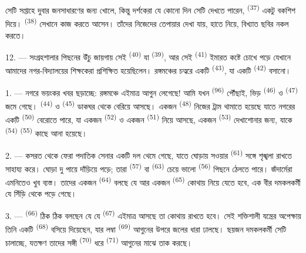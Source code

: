 সেটি সপ্তাহে দুবার জনসাধারণের জন্য খোলে, কিন্তু দর্শকেরা যে কোনো দিন সেটি
দেখতে পারেন,  \textsuperscript{(37)} একটু বকশিশ দিয়ে।
 \textsuperscript{(38)} সেখানে কাজ করতে আসেন। তাঁদের নিজেদের
তেপায়ার  দেখা যায়, হাতে  নিয়ে, বিখ্যাত ছবির
নকল করতে।

12. --- সংগ্রহশালার পিছনের উঁচু জায়গায় সেই 
\textsuperscript{(40)} যা  \textsuperscript{(39)}, আর সেই
 \textsuperscript{(41)} ইমারত কষ্টে চোখে
পড়ে যেখানে আমাদের নগর-বিদ্যালয়ের শিক্ষকেরা প্রশিক্ষিত হয়েছিলেন। রঙ্গমঞ্চের
চত্বরে একটি  \textsuperscript{(43)}, যা একটি  \textsuperscript{(42)} বসানো।

\VUsaut{5.0mm}
\VUsaut{3.0mm}

\VUsaut{3.4mm}

1. --- নগরে ভয়ংকর খবর ছড়াচ্ছে: রঙ্গমঞ্চে এইমাত্র আগুন লেগেছে! আমি যখন
 \textsuperscript{(96)} পৌঁছাই, ভিড় 
\textsuperscript{(46)} ও  \textsuperscript{(47)} জমে গেছে।
 \textsuperscript{(44)} ও 
\textsuperscript{(45)} ডাকঘর থেকে বেরিয়ে আসছে। একজন 
\textsuperscript{(48)} নিজের ট্রাম থামাতে হয়েছে যাতে নগরের একটি
 \textsuperscript{(50)} বেরোতে পারে, যা একজন
 \textsuperscript{(52)} ও একজন 
\textsuperscript{(51)} নিয়ে আসছে, একজন  \textsuperscript{(53)}
দেখাশোনার জন্য, যাকে  \textsuperscript{(54)}
 \textsuperscript{(55)} কাছে আনা হয়েছে।

2. --- কসরত থেকে ফেরা পদাতিক সেনার একটি দল থেমে গেছে, যাতে ঘোড়ায় সওয়ার
 \textsuperscript{(61)} সঙ্গে শৃঙ্খলা রাখতে সাহায্য করে।
 ঘোড়া দু পায়ে দাঁড়িয়ে পড়ে; তারা 
\textsuperscript{(57)} বা  \textsuperscript{(63)} চেয়ে ভালো
 \textsuperscript{(56)} পিছনে ঠেলতে পারে। জঁদার্মেরা এমনিতেও খুব
ব্যস্ত। তাদের একজন  \textsuperscript{(64)} বলছে যে আর
একজন  \textsuperscript{(65)} কোথায় নিয়ে যেতে হবে, এক বীর দমকলকর্মী
যে সিঁড়ি থেকে পড়ে গেছে।

3. ---  \textsuperscript{(66)} ঠিক ঠিক বলছেন যে যে 
\textsuperscript{(67)} এইমাত্র আসছে তা কোথায় রাখতে হবে। সেই শক্তিশালী যন্ত্রের
অপেক্ষায় তিনি একটি  \textsuperscript{(68)} বসিয়ে দিয়েছেন,
যার লম্বা  \textsuperscript{(69)} আগুনের উপরে জলের ধারা ঢালছে। ছয়জন
দমকলকর্মী সেটি চালাচ্ছে, যতক্ষণ তাদের সঙ্গী 
\textsuperscript{(70)} ধরে  \textsuperscript{(71)} আগুনের মাঝে
তাক করছে।

